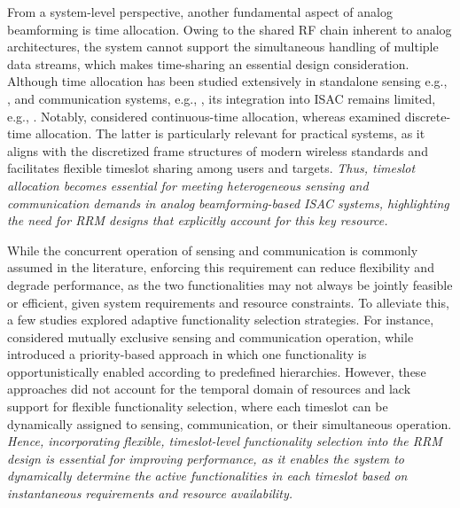 \documentclass[10pt,journal,compsoc]{IEEEtran}
\theoremstyle{myremark}
\theoremstyle{myexample}
\begin{document}
From a system-level perspective, another fundamental aspect of analog beamforming is time allocation. Owing to the shared \gls{RF} chain inherent to analog architectures, the system cannot support the simultaneous handling of multiple data streams, which makes time-sharing an essential design consideration. Although time allocation has been studied extensively in standalone sensing e.g., \cite{liu2020:cognitive-dwell-time-allocation-distributed-radar-sensor-networks-tracking-cone-programming , zhang2023:fast-solver-dwell-time-allocation-phased-array-radar }, and communication systems, e.g., \cite{abanto2020:hydrawave-multi-group-multicast-hybrid-precoding-low-latency-scheduling-ubiquitous-industry-4-0-mmwave-communications , nguyen2017:joint-fractional-time-allocation-beamforming-downlink-multiuser-miso-systems }, its integration into \gls{ISAC} remains limited, e.g., \cite{xu2023:sensing-enhanced-secure-communication-joint-time-allocation-beamforming-design, wang2024:resource-allocation-isac-networks-application-target-tracking}. Notably, \cite{xu2023:sensing-enhanced-secure-communication-joint-time-allocation-beamforming-design} considered continuous-time allocation, whereas \cite{wang2024:resource-allocation-isac-networks-application-target-tracking} examined discrete-time allocation. The latter is particularly relevant for practical systems, as it aligns with the discretized frame structures of modern wireless standards and facilitates flexible timeslot sharing among users and targets. \emph{Thus, timeslot allocation becomes essential for meeting heterogeneous sensing and communication demands in analog beamforming-based \gls{ISAC} systems, highlighting the need for \gls{RRM} designs that explicitly account for this key resource.}



While the concurrent operation of sensing and communication is commonly assumed in the literature, enforcing this requirement can reduce flexibility and degrade performance, as the two functionalities may not always be jointly feasible or efficient, given system requirements and resource constraints. To alleviate this, a few studies explored adaptive functionality selection strategies. For instance, \cite{li2022:multi-point-integrated-sensing-communication-fusion-model-functionality-selection} considered mutually exclusive sensing and communication operation, while \cite{abanto2024:hierarchical-functionality-prioritization-multicast-isac-optimal-admission-control-discrete-phase-beamforming} introduced a priority-based approach in which one functionality is opportunistically enabled according to predefined hierarchies. However, these approaches did not account for the temporal domain of resources and lack support for flexible functionality selection, where each timeslot can be dynamically assigned to sensing, communication, or their simultaneous operation. \emph{Hence, incorporating flexible, timeslot-level functionality selection into the \gls{RRM} design is essential for improving performance, as it enables the system to dynamically determine the active functionalities in each timeslot based on instantaneous requirements and resource availability.}
\end{document}
